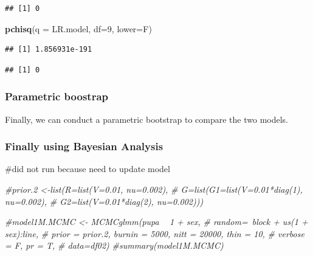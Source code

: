 \documentclass[
]{article}
\newenvironment{Shaded}{\begin{snugshade}}{\end{snugshade}}
\newcommand{\CommentTok}[1]{\textcolor[rgb]{0.56,0.35,0.01}{\textit{#1}}}
\newcommand{\DataTypeTok}[1]{\textcolor[rgb]{0.13,0.29,0.53}{#1}}
\newcommand{\DecValTok}[1]{\textcolor[rgb]{0.00,0.00,0.81}{#1}}
\newcommand{\KeywordTok}[1]{\textcolor[rgb]{0.13,0.29,0.53}{\textbf{#1}}}
\newcommand{\NormalTok}[1]{#1}
\newcommand{\OperatorTok}[1]{\textcolor[rgb]{0.81,0.36,0.00}{\textbf{#1}}}
\begin{document}
\begin{verbatim}
## [1] 0
\end{verbatim}

\begin{Shaded}
\begin{Highlighting}[]
\KeywordTok{pchisq}\NormalTok{(}\DataTypeTok{q =}\NormalTok{ LR.model, }\DataTypeTok{df=}\DecValTok{9}\NormalTok{, }\DataTypeTok{lower=}\NormalTok{F)}
\end{Highlighting}
\end{Shaded}

\begin{verbatim}
## [1] 1.856931e-191
\end{verbatim}

\begin{Shaded}
\end{Shaded}

\begin{verbatim}
## [1] 0
\end{verbatim}

\hypertarget{parametric-boostrap-4}{%
\subsubsection{Parametric boostrap}\label{parametric-boostrap-4}}

Finally, we can conduct a parametric bootstrap to compare the two
models.

\hypertarget{finally-using-bayesian-analysis-4}{%
\subsubsection{Finally using Bayesian
Analysis}\label{finally-using-bayesian-analysis-4}}

\#did not run because need to update model

\begin{Shaded}
\begin{Highlighting}[]
\CommentTok{#prior.2 <-list(R=list(V=0.01, nu=0.002), }
 \CommentTok{#              G=list(G1=list(V=0.01*diag(1), nu=0.002),}
  \CommentTok{#                    G2=list(V=0.01*diag(2), nu=0.002)))}

\CommentTok{#model1M.MCMC <- MCMCglmm(pupa ~ 1 + sex, }
 \CommentTok{# random=~block + us(1 + sex):line,}
\CommentTok{#  prior = prior.2, burnin = 5000, nitt = 20000, thin = 10,}
 \CommentTok{# verbose = F, pr = T,}
\CommentTok{#  data=df02)}
\CommentTok{#summary(model1M.MCMC)}
\end{Highlighting}
\end{Shaded}
\end{document}
